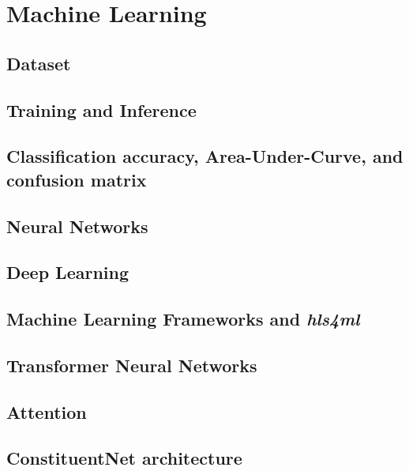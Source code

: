 \section{Machine Learning}

\subsection{Dataset}


\subsection{Training and Inference}


\subsection{Classification accuracy, Area-Under-Curve, and confusion matrix} \label{ml-accuracy-auc-confusion}


\subsection{Neural Networks}


\subsection{Deep Learning}


\subsection{Machine Learning Frameworks and \textit{hls4ml}}


\subsection{Transformer Neural Networks}


\subsection{Attention}


\subsection{ConstituentNet architecture}
